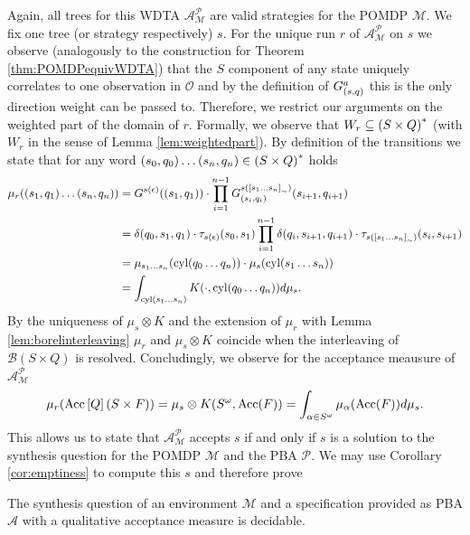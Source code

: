 Again, all trees for this \ac{WDTA} $\mathcal{A}_{\mathcal{M}}^{\mathcal{P}}$
are valid strategies for the \ac{POMDP} $\mathcal{M}$. We fix one tree (or
strategy respectively) $s$. For the unique run $r$ of
$\mathcal{A}_{\mathcal{M}}^{\mathcal{P}}$ on $s$ we observe (analogously to the
construction for Theorem \ref{thm:POMDPequivWDTA}) that the $S$ component of
any state uniquely correlates to one observation in $\mathcal{O}$ and by the
definition of $G_{\left(s, q\right)}^{a}$ this is the only direction weight can be
passed to. Therefore, we restrict our arguments on the weighted part of the
domain of $r$. Formally, we observe that $W_{r}\subseteq\left(S\times Q\right)^{*}$
(with $W_{r}$ in the sense of Lemma \ref{lem:weightedpart}). By definition of
the transitions we state that for any word 
$\left(s_{0}, q_{0}\right)\dots\left(s_{n}, q_{n}\right)\in\left(S\times Q\right)^{*}$ holds
\begin{align*}
  \mu_{r}(\left(s_{1}, q_{1}\right)\dots\left(s_{n}, q_{n}\right)) &= 
    G^{s(\epsilon)}(\left(s_{1}, q_{1}\right))\cdot 
    \prod\limits_{i = 1}^{n-1}
      G^{s(\left[s_{1}\dots s_{n}\right]_{\sim})}_{\left(s_{i}, q_{i}\right)}(
        s_{i+1}, q_{i+1})\\
  &= \delta(q_{0}, s_{1}, q_{1})\cdot\tau_{s(\epsilon)}(s_{0}, s_{1})
    \prod\limits_{i = 1}^{n-1}
      \delta(q_{i}, s_{i+1}, q_{i+1})\cdot
      \tau_{s(\left[s_{1}\dots s_{n}\right]_{\sim})}(s_{i}, s_{i+1})\\
  &= \mu_{s_{1}\dots s_{n}}(\operatorname{cyl}(q_{0}\dots q_{n}))\cdot
    \mu_{s}(\operatorname{cyl}(s_{1}\dots s_{n}))\\
  &= \int_{\operatorname{cyl}(s_{1}\dots s_{n})}K(\cdot, \operatorname{cyl}(q_{0}\dots q_{n}))d\mu_{s}.
\end{align*}
By the uniqueness of $\mu_{s}\otimes K$ and the extension of $\mu_{r}$ with
Lemma \ref{lem:borelinterleaving} $\mu_{r}$ and $\mu_{s}\otimes K$ coincide
when the interleaving of $\mathcal{B}(S\times Q)$ is resolved. Concludingly, we
observe for the acceptance meausure of
$\mathcal{A}_{\mathcal{M}}^{\mathcal{P}}$
\begin{equation*}
  \mu_{r}(\operatorname{Acc}\left[Q\right](S\times F))
  = \mu_{s}\otimes K(S^{\omega}, \operatorname{Acc}(F))
  = \int_{\alpha\in S^{\omega}}\mu_{\alpha}(\operatorname{Acc}(F)) d\mu_{s}.
\end{equation*}
This allows us to state that $\mathcal{A}_{\mathcal{M}}^{\mathcal{P}}$ 
accepts $s$ if and only if $s$ is a solution to the synthesis question for 
the \ac{POMDP} $\mathcal{M}$ and the \ac{PBA} $\mathcal{P}$. We may use
Corollary \ref{cor:emptiness} to compute this $s$ and therefore prove
\begin{theorem}
  The synthesis question of an environment $\mathcal{M}$ and a specification
  provided as \ac{PBA} $\mathcal{A}$ with a qualitative acceptance measure
  is decidable.
  \label{thm:pbasynthesis}
\end{theorem}


